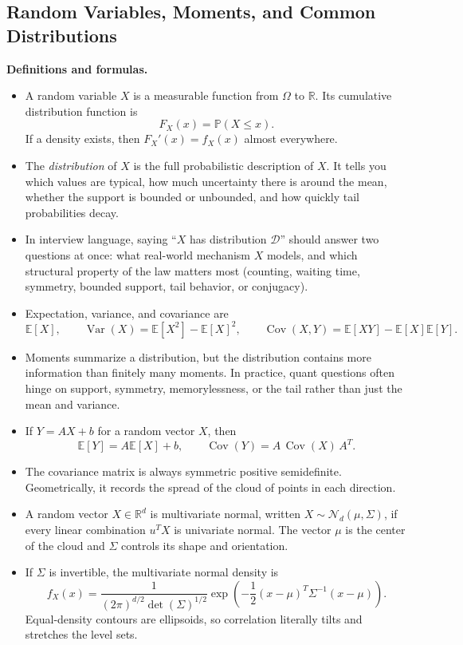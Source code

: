 \documentclass[11pt]{article}
\theoremstyle{definition}
\newcommand{\R}{\mathbb{R}}
\newcommand{\E}{\mathbb{E}}
\newcommand{\Var}{\operatorname{Var}}
\newcommand{\Cov}{\operatorname{Cov}}
\begin{document}
\subsection{Random Variables, Moments, and Common Distributions}
\textbf{Definitions and formulas.}
\begin{itemize}
    \item A random variable $X$ is a measurable function from $\Omega$ to $\R$. Its cumulative distribution function is
    \[
        F_X(x)=\mathbb{P}(X\le x).
    \]
    If a density exists, then $F_X'(x)=f_X(x)$ almost everywhere.
    \item The \emph{distribution} of $X$ is the full probabilistic description of $X$. It tells you which values are typical, how much uncertainty there is around the mean, whether the support is bounded or unbounded, and how quickly tail probabilities decay.
    \item In interview language, saying ``$X$ has distribution $\mathcal{D}$'' should answer two questions at once: what real-world mechanism $X$ models, and which structural property of the law matters most (counting, waiting time, symmetry, bounded support, tail behavior, or conjugacy).
    \item Expectation, variance, and covariance are
    \[
        \E[X], \qquad \Var(X)=\E[X^2]-\E[X]^2, \qquad \Cov(X,Y)=\E[XY]-\E[X]\E[Y].
    \]
    \item Moments summarize a distribution, but the distribution contains more information than finitely many moments. In practice, quant questions often hinge on support, symmetry, memorylessness, or the tail rather than just the mean and variance.
    \item If $Y=AX+b$ for a random vector $X$, then
    \[
        \E[Y]=A\E[X]+b, \qquad \Cov(Y)=A\,\Cov(X)\,A^T.
    \]
    \item The covariance matrix is always symmetric positive semidefinite. Geometrically, it records the spread of the cloud of points in each direction.
    \item A random vector $X\in \R^d$ is multivariate normal, written $X\sim \mathcal{N}_d(\mu,\Sigma)$, if every linear combination $u^TX$ is univariate normal. The vector $\mu$ is the center of the cloud and $\Sigma$ controls its shape and orientation.
    \item If $\Sigma$ is invertible, the multivariate normal density is
    \[
        f_X(x)=\frac{1}{(2\pi)^{d/2}\det(\Sigma)^{1/2}}\exp\!\left(-\frac12(x-\mu)^T\Sigma^{-1}(x-\mu)\right).
    \]
    Equal-density contours are ellipsoids, so correlation literally tilts and stretches the level sets.

\end{itemize}
\end{document}
